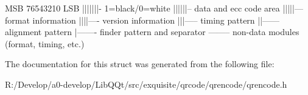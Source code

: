 \begin{DoxyPre}
MSB 76543210 LSB
    |||||||{\ttfamily - 1=black/0=white
    ||||||}-- data and ecc code area
    |||||{\ttfamily --- format information
    ||||}---- version information
    |||{\ttfamily ----- timing pattern
    ||}------ alignment pattern
    |{\ttfamily ------- finder pattern and separator
}-------- non-data modules (format, timing, etc.)
\end{DoxyPre}
 

The documentation for this struct was generated from the following file\+:\begin{DoxyCompactItemize}
\item 
R\+:/\+Develop/a0-\/develop/\+Lib\+Q\+Qt/src/exquisite/qrcode/qrencode/qrencode.\+h\end{DoxyCompactItemize}
